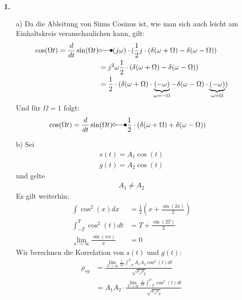 \documentclass[a4paper,11pt]{article}
\author{\authorinfotitle}
\title{\titleinfo}
\date{\today}
\begin{document}
	\maketitle
	\begin{enumerate}
		\item[\textbf{1.}]
			\begin{enumerate}
				\item[a)]
				Da die Ableitung von Sinus Cosinus ist, wie man sich auch leicht am Einhaltskreis veranschaulichen kann, gilt:
				\begin{align*}
				\cos(\Omega t) = \frac{d}{dt} \sin(\Omega t) &\laplace (j\omega) \cdot (\frac{1}{2}j \cdot (\delta(\omega + \Omega) - \delta(\omega - \Omega)) \\
				&= j^2\omega\frac{1}{2} \cdot (\delta(\omega + \Omega) - \delta(\omega - \Omega)) \\
				&= \frac{1}{2} \cdot (\delta(\omega + \Omega) \cdot \underbrace{(-\omega)}_{\omega = - \Omega} - \delta(\omega - \Omega) \cdot  \underbrace{(-\omega)}_{\omega = \Omega})
				\end{align*}
				Und für $\Omega = 1$ folgt:
				\begin{align*}
				\cos(\Omega t) = \frac{d}{dt} \sin(\Omega t) &\laplace \frac{1}{2} \cdot (\delta(\omega + \Omega) + \delta(\omega - \Omega))
				\end{align*}
				\item[b)]
					Sei
					\begin{align*}
						s(t) = A_1 \cos(t) \\
						g(t) = A_2 \cos(t)
					\end{align*}
					und gelte
					\begin{align}
						A_1 \neq A_2
					\end{align}
					Es gilt weiterhin:
					\begin{align}
						\int \cos^2(x)dx &= \frac{1}{2} (x + \frac{\sin(2x)}{2}) \\
						\int_{-T}^T \cos^2(t)dt &= T + \frac{\sin(2T)}{2} \\
						\lim_{x \to \infty} \frac{\sin(nx)}{x} &= 0
					\end{align}
					Wir berechnen die Korrelation von $s(t)$ und $g(t)$:
					\begin{align*}
						\rho_{sg} &= \frac{\displaystyle \lim_{T \to \infty} \frac{1}{2T} \int_{-T}^T A_1 A_2 \cos^2(t) dt}{\sqrt{\rho_s\rho_g}} \\
								  &= A_1A_2 \cdot \frac{\displaystyle \lim_{T \to \infty} \frac{1}{2T} \int_{-T}^T \cos^2(t) dt}{\sqrt{\rho_s\rho_g}} \\

\end{align*}
\end{enumerate}
\end{enumerate}
\end{document}
